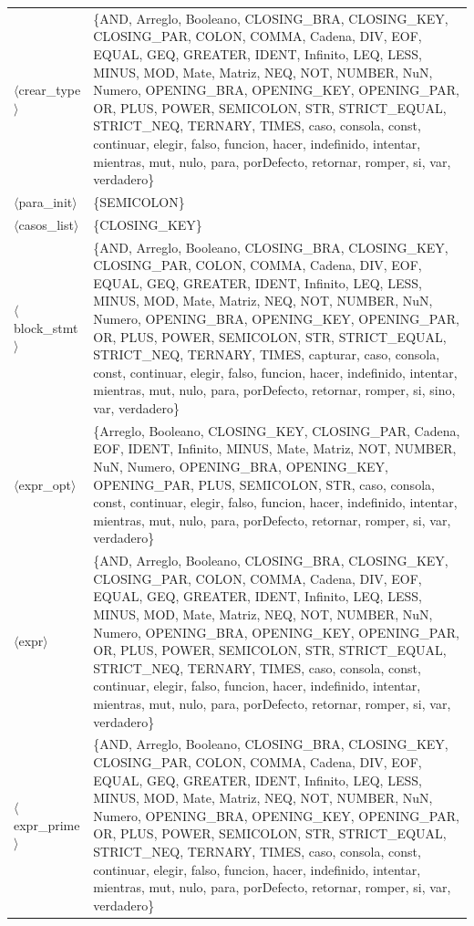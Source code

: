 \documentclass[10pt]{article}
\begin{document}
{\begin{longtable}{@{} p{3.5cm} p{13cm} @{}}
  \parbox[t]{3.3cm}{\raggedright$\langle$crear\_\allowbreak{}type$\rangle$} & \{AND, Arreglo, Booleano, CLOSING\_BRA, CLOSING\_KEY, CLOSING\_PAR, COLON, COMMA, Cadena, DIV, EOF, EQUAL, GEQ, GREATER, IDENT, Infinito, LEQ, LESS, MINUS, MOD, Mate, Matriz, NEQ, NOT, NUMBER, NuN, Numero, OPENING\_BRA, OPENING\_KEY, OPENING\_PAR, OR, PLUS, POWER, SEMICOLON, STR, STRICT\_EQUAL, STRICT\_NEQ, TERNARY, TIMES, caso, consola, const, continuar, elegir, falso, funcion, hacer, indefinido, intentar, mientras, mut, nulo, para, porDefecto, retornar, romper, si, var, verdadero\} \\
  \parbox[t]{3.3cm}{\raggedright$\langle$para\_\allowbreak{}init$\rangle$} & \{SEMICOLON\} \\
  \parbox[t]{3.3cm}{\raggedright$\langle$casos\_\allowbreak{}list$\rangle$} & \{CLOSING\_KEY\} \\
  \parbox[t]{3.3cm}{\raggedright$\langle$block\_\allowbreak{}stmt$\rangle$} & \{AND, Arreglo, Booleano, CLOSING\_BRA, CLOSING\_KEY, CLOSING\_PAR, COLON, COMMA, Cadena, DIV, EOF, EQUAL, GEQ, GREATER, IDENT, Infinito, LEQ, LESS, MINUS, MOD, Mate, Matriz, NEQ, NOT, NUMBER, NuN, Numero, OPENING\_BRA, OPENING\_KEY, OPENING\_PAR, OR, PLUS, POWER, SEMICOLON, STR, STRICT\_EQUAL, STRICT\_NEQ, TERNARY, TIMES, capturar, caso, consola, const, continuar, elegir, falso, funcion, hacer, indefinido, intentar, mientras, mut, nulo, para, porDefecto, retornar, romper, si, sino, var, verdadero\} \\
  \parbox[t]{3.3cm}{\raggedright$\langle$expr\_\allowbreak{}opt$\rangle$} & \{Arreglo, Booleano, CLOSING\_KEY, CLOSING\_PAR, Cadena, EOF, IDENT, Infinito, MINUS, Mate, Matriz, NOT, NUMBER, NuN, Numero, OPENING\_BRA, OPENING\_KEY, OPENING\_PAR, PLUS, SEMICOLON, STR, caso, consola, const, continuar, elegir, falso, funcion, hacer, indefinido, intentar, mientras, mut, nulo, para, porDefecto, retornar, romper, si, var, verdadero\} \\
  \parbox[t]{3.3cm}{\raggedright$\langle$expr$\rangle$} & \{AND, Arreglo, Booleano, CLOSING\_BRA, CLOSING\_KEY, CLOSING\_PAR, COLON, COMMA, Cadena, DIV, EOF, EQUAL, GEQ, GREATER, IDENT, Infinito, LEQ, LESS, MINUS, MOD, Mate, Matriz, NEQ, NOT, NUMBER, NuN, Numero, OPENING\_BRA, OPENING\_KEY, OPENING\_PAR, OR, PLUS, POWER, SEMICOLON, STR, STRICT\_EQUAL, STRICT\_NEQ, TERNARY, TIMES, caso, consola, const, continuar, elegir, falso, funcion, hacer, indefinido, intentar, mientras, mut, nulo, para, porDefecto, retornar, romper, si, var, verdadero\} \\
  \parbox[t]{3.3cm}{\raggedright$\langle$expr\_\allowbreak{}prime$\rangle$} & \{AND, Arreglo, Booleano, CLOSING\_BRA, CLOSING\_KEY, CLOSING\_PAR, COLON, COMMA, Cadena, DIV, EOF, EQUAL, GEQ, GREATER, IDENT, Infinito, LEQ, LESS, MINUS, MOD, Mate, Matriz, NEQ, NOT, NUMBER, NuN, Numero, OPENING\_BRA, OPENING\_KEY, OPENING\_PAR, OR, PLUS, POWER, SEMICOLON, STR, STRICT\_EQUAL, STRICT\_NEQ, TERNARY, TIMES, caso, consola, const, continuar, elegir, falso, funcion, hacer, indefinido, intentar, mientras, mut, nulo, para, porDefecto, retornar, romper, si, var, verdadero\} \\

\end{longtable}}
\end{document}
